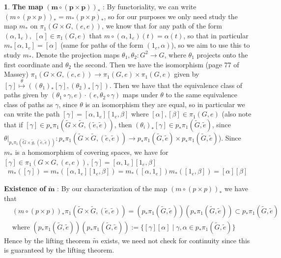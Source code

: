 \documentclass[10.5pt]{article}
\theoremstyle{definition}
\newtheorem{pb}{}
\newcommand{\set}[1]{\{#1\}}
\begin{document}
\begin{pb}
        \textbf{The map} \(\mathbf{(m \circ (p\times p))_*}\) : By functoriality, we can write 
        \((m \circ (p\times p))_* = m_* (p\times p)_*\), so for our purposes we only need study the map \(m_*\) on \(\pi_1(G \times G,(e,e))\), we know that for any path of the form \((\alpha,1_e), \; [\alpha] \in \pi_1(G,e)\) that \(m \circ (\alpha,1_e) (t) = \alpha(t)\), so that in particular \(m_* [\alpha,1_e] = [\alpha]\) (same for paths of the form \((1_e,\alpha)\)), so we aim to use this to study \(m_*\). Denote the projection maps \(\theta_1,\theta_2: G^2 \to G\), where \(\theta_1\) projects onto the first coordinate and \(\theta_2\) the second. Then we have the isomorphism (page 77 of Massey) \(\pi_1(G \times G,(e,e)) \to \pi_1(G,e) \times \pi_1(G,e)\) given by \([\gamma] \overset{\theta}{\mapsto} ((\theta_1)_*[\gamma],(\theta_2)_*[\gamma])\). Then we have that the equivalence class of paths given by \((\theta_1\circ\gamma, e)\cdot(e,\theta_2\circ\gamma)\) maps under \(\theta\) to the same equivalence class of paths as \(\gamma\), since \(\theta\) is an isomorphism they are equal, so in particular we can write the path \([\gamma] = [\alpha,1_e][1_e,\beta]\) where \([\alpha], [\beta] \in \pi_1(G,e)\) (also note that if \([\gamma] \in p_*\pi_1(\tilde{G} \times{\tilde{G}},(\tilde{e},\tilde{e}))\), then \((\theta_i)_*[\gamma] \in p_*\pi_1(\tilde{G},\tilde{e})\), since \(\theta\vert_{p_*\pi_1(\tilde{G}\times\tilde{g},(\tilde{e},\tilde{e}))}: p_*\pi_1(\tilde{G}\times\tilde{G},(\tilde{e},\tilde{e})) \to p_*\pi_1(\tilde{G},\tilde{e}) \times p_*\pi_1(\tilde{G},\tilde{e})\)). Since \(m_*\) is a homomorphism of covering spaces, we have for \([\gamma] \in \pi_1(G\times G, (e,e)), [\gamma] = [\alpha,1_e][1_e,\beta]\) 
        \begin{align*}
            m_*([\gamma]) = m_*([\alpha,1_e][1_e,\beta]) = m_*([\alpha,1_e])m_*([1_e,\beta]) = [\alpha][\beta]
        \end{align*}

        \textbf{Existence of }\(\mathbf{\tilde{m}}\) : By our characterization of the map \((m \circ (p\times p))_*\) we have that 
        \begin{align*}
            &(m \circ (p\times p))_*\pi_1(\tilde{G}\times\tilde{G},(\tilde{e},\tilde{e})) = (p_*\pi_1(\tilde{G},\tilde{e}))(p_*\pi_1(\tilde{G},\tilde{e})) \subset p_*\pi_1(\tilde{G},\tilde{e}) \\
            &\text{where } (p_*\pi_1(\tilde{G},\tilde{e}))(p_*\pi_1(\tilde{G},\tilde{e})) := \set{[\gamma][\alpha]\;\vert \; \gamma, \alpha \in p_*\pi_1(\tilde{G},\tilde{e})}
        \end{align*}
        Hence by the lifting theorem \(\tilde{m}\) exists, we need not check for continuity since this is guaranteed by the lifting theorem.


\end{pb}
\end{document}
